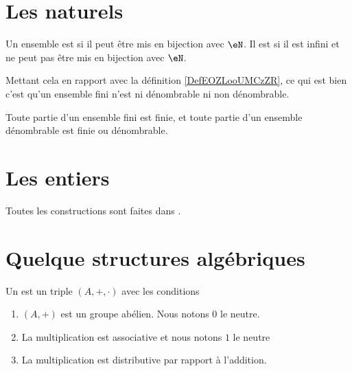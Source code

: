 \section{Les naturels}

\begin{definition}
    Un ensemble est  si il peut être mis en bijection avec \( \eN\). Il est  si il est infini et ne peut pas être mis en bijection avec \( \eN\).
\end{definition}
Mettant cela en rapport avec la définition \ref{DefEOZLooUMCzZR}, ce qui est bien c'est qu'un ensemble fini n'est ni dénombrable ni non dénombrable.

\begin{proposition} \label{PropQEPoozLqOQ}
    Toute partie d'un ensemble fini est finie, et toute partie d'un ensemble dénombrable est finie ou dénombrable.
\end{proposition}

\section{Les entiers}

Toutes les constructions sont faites dans \cite{RWWJooJdjxEK}.

\section{Quelque structures algébriques}

\begin{definition}     \label{DefHXJUooKoovob}
    Un  est un triple \( (A,+,\cdot)\) avec les conditions
    \begin{enumerate}
        \item
            \( (A,+)\) est un groupe abélien. Nous notons \( 0\) le neutre.
        \item
            La multiplication est associative et nous notons \( 1\) le neutre
        \item
            La multiplication est distributive par rapport à l'addition.
    \end{enumerate}
\end{definition}

